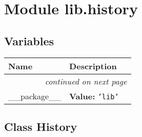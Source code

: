 %
%
%


\section{Module lib.history}

    \label{lib:history}


  \subsection{Variables}

    \vspace{-1cm}
\hspace{\varindent}\begin{longtable}{|p{\varnamewidth}|p{\vardescrwidth}|l}
\cline{1-2}
\cline{1-2} \centering \textbf{Name} & \centering \textbf{Description}& \\
\cline{1-2}
\endhead\cline{1-2}\multicolumn{3}{r}{\small\textit{continued on next page}}\\\endfoot\cline{1-2}
\endlastfoot\raggedright \_\-\_\-p\-a\-c\-k\-a\-g\-e\-\_\-\_\- & \raggedright \textbf{Value:} 
{\tt \texttt{'}\texttt{lib}\texttt{'}}&\\
\cline{1-2}
\end{longtable}



\subsection{Class History}

